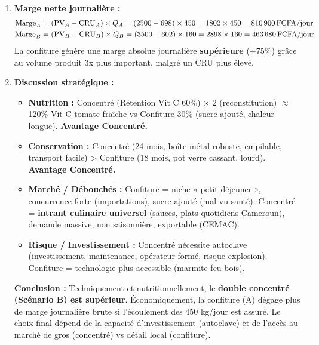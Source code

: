 \documentclass[11pt]{article}
\begin{document}
\begin{exoresolu}
\begin{enumerate}
            \textbf{Résultat :} CRU Confiture = \SI{698}{FCFA/kg} > CRU Concentré = \SI{602}{FCFA/kg}. \emph{Le concentré coûte moins cher à produire au kg car l'emballage (boîte métal) est 2x moins cher que le pot verre, et pas de sucre, malgré le rendement 3x plus faible.}
        \item \textbf{Marge nette journalière :}
            \begin{align*}
                \text{Marge}_A &= (\text{PV}_A - \text{CRU}_A) \times Q_A = (2500 - 698) \times 450 = 1802 \times 450 = \mathbf{\SI{810\,900}{FCFA/jour}} \\
                \text{Marge}_B &= (\text{PV}_B - \text{CRU}_B) \times Q_B = (3500 - 602) \times 160 = 2898 \times 160 = \mathbf{\SI{463\,680}{FCFA/jour}}
            \end{align*}
            La confiture génère une marge absolue journalière \textbf{supérieure} (+75\%) grâce au volume produit 3x plus important, malgré un CRU plus élevé.
        \item \textbf{Discussion stratégique :}
            \begin{itemize}
                \item \textbf{Nutrition :} Concentré (Rétention Vit C 60\%) $\times$ 2 (reconstitution) $\approx$ 120\% Vit C tomate fraîche vs Confiture 30\% (sucre ajouté, chaleur longue). \textbf{Avantage Concentré.}
                \item \textbf{Conservation :} Concentré (24 mois, boîte métal robuste, empilable, transport facile) > Confiture (18 mois, pot verre cassant, lourd). \textbf{Avantage Concentré.}
                \item \textbf{Marché / Débouchés :} Confiture = niche « petit-déjeuner », concurrence forte (importations), sucre ajouté (mal vu santé). Concentré = \textbf{intrant culinaire universel} (sauces, plats quotidiens Cameroun), demande massive, non saisonnière, exportable (CEMAC).
                \item \textbf{Risque / Investissement :} Concentré nécessite autoclave (investissement, maintenance, opérateur formé, risque explosion). Confiture = technologie plus accessible (marmite feu bois).
            \end{itemize}
            \textbf{Conclusion :} Techniquement et nutritionnellement, le \textbf{double concentré (Scénario B) est supérieur}. Économiquement, la confiture (A) dégage plus de marge journalière brute si l'écoulement des 450 kg/jour est assuré. Le choix final dépend de la capacité d'investissement (autoclave) et de l'accès au marché de gros (concentré) vs détail local (confiture).
    \end{enumerate}
\end{exoresolu}
\end{document}
